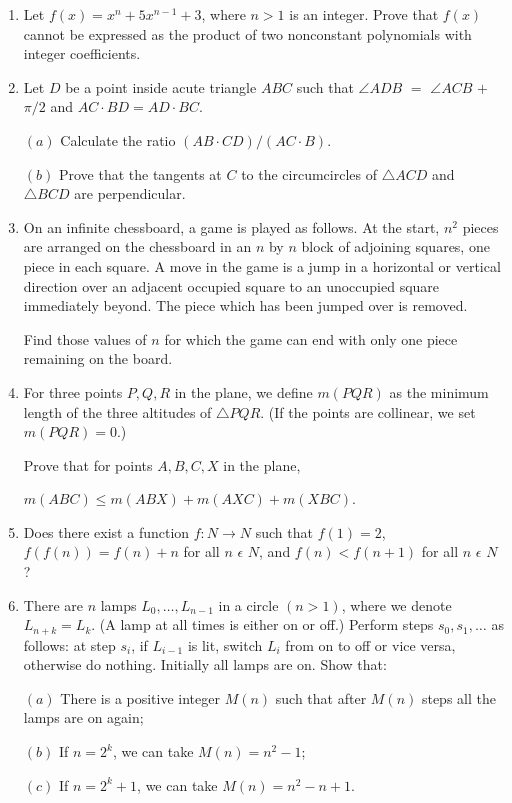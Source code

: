 \documentclass{article}
\begin{document}
\begin{enumerate}

\item Let $f(x)=x^{n}+5x^{n-1}+3$, where $n>1$ is an integer. Prove that $f(x)$ cannot be expressed as the product of two nonconstant polynomials with integer coefficients.

\item Let $D$ be a point inside acute triangle $ABC$ such that $\angle ADB$ $=$ $\angle ACB$ $+$ $\pi/2$ and $AC \cdot BD = AD \cdot BC$. 
 
$(a)$ Calculate the ratio $(AB \cdot CD) / (AC \cdot B)$.
	
$(b)$ Prove that the tangents at $C$ to the circumcircles of $\triangle ACD$ and $\triangle BCD$ are perpendicular.

\item On an infinite chessboard, a game is played as follows. At the start, $n^{2}$ pieces are arranged on the chessboard in an $n$ by $n$ block of adjoining squares, one piece in each square. A move in the game is a jump in a horizontal or vertical direction over an adjacent occupied square to an unoccupied square immediately beyond. The piece which has been jumped over is removed.

Find those values of $n$ for which the game can end with only one piece remaining on the board.

\item For three points $P, Q, R$ in the plane, we define $m(PQR)$ as the minimum length of the three altitudes of $\triangle PQR$. (If the points are collinear, we set $m(PQR) = 0$.)


Prove that for points $A, B, C, X$ in the plane,

$m(ABC) \leq m(ABX) + m(AXC) + m(XBC)$.

\item Does there exist a function $f : N \rightarrow N$ such that $f(1) = 2$, $f(f(n)) = f(n) + n$ for all $n$ $\epsilon$ $N$, and $f(n) < f(n + 1)$ for all $n$ $\epsilon$ $N$ ?

\item There are $n$ lamps $L_0, \dots , L_{ n-1 }$ in a circle $(n > 1) $, where we denote $L_{n+k} = L_k$. (A lamp at all times is either on or off.) Perform steps $s_0, s_1, \dots $ as follows: at step $s_i$, if $L_{i-1}$ is lit, switch $L_i$ from on to off or vice versa, otherwise do nothing. Initially all lamps are on. Show that:

$(a)$ There is a positive integer $M(n)$ such that after $M(n)$ steps all the lamps are on again;

$(b)$ If $n = 2^{k}$, we can take $M(n) = n^{2}-1$; 


$(c)$ If $n = 2^{k}+1$, we can take $M(n) = n^{2}-n+1$.

\end{enumerate}
\end{document}
